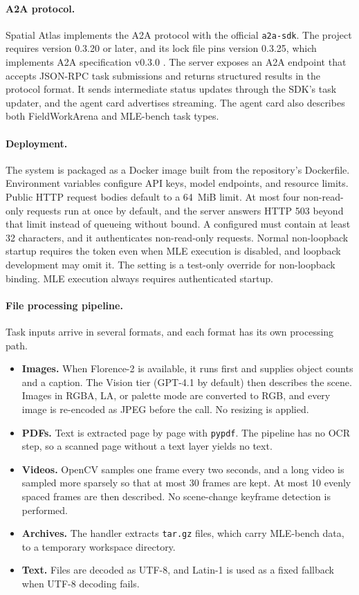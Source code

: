 \documentclass{article}
\begin{document}
\paragraph{A2A protocol.}
Spatial Atlas implements the A2A protocol with the official \texttt{a2a-sdk}. The project requires version 0.3.20 or later, and its lock file pins version 0.3.25, which implements A2A specification v0.3.0 \citep{google2024a2a}. The server exposes an A2A endpoint that accepts JSON-RPC task submissions and returns structured results in the protocol format. It sends intermediate status updates through the SDK's task updater, and the agent card advertises streaming. The agent card also describes both FieldWorkArena and MLE-bench task types.

\paragraph{Deployment.}
The system is packaged as a Docker image built from the repository's Dockerfile. Environment variables configure API keys, model endpoints, and resource limits. Public HTTP request bodies default to a 64~MiB limit. At most four non-read-only requests run at once by default, and the server answers HTTP 503 beyond that limit instead of queueing without bound. A configured  must contain at least 32 characters, and it authenticates non-read-only requests. Normal non-loopback startup requires the token even when MLE execution is disabled, and loopback development may omit it. The setting  is a test-only override for non-loopback binding. MLE execution always requires authenticated startup.

\paragraph{File processing pipeline.}
Task inputs arrive in several formats, and each format has its own processing path.
\begin{itemize}[leftmargin=*,nosep]
  \item \textbf{Images.} When Florence-2 is available, it runs first and supplies object counts and a caption. The Vision tier (GPT-4.1 by default) then describes the scene. Images in RGBA, LA, or palette mode are converted to RGB, and every image is re-encoded as JPEG before the call. No resizing is applied.
  \item \textbf{PDFs.} Text is extracted page by page with \texttt{pypdf}. The pipeline has no OCR step, so a scanned page without a text layer yields no text.
  \item \textbf{Videos.} OpenCV samples one frame every two seconds, and a long video is sampled more sparsely so that at most 30 frames are kept. At most 10 evenly spaced frames are then described. No scene-change keyframe detection is performed.
  \item \textbf{Archives.} The handler extracts \texttt{tar.gz} files, which carry MLE-bench data, to a temporary workspace directory.
  \item \textbf{Text.} Files are decoded as UTF-8, and Latin-1 is used as a fixed fallback when UTF-8 decoding fails.
\end{itemize}
\end{document}
